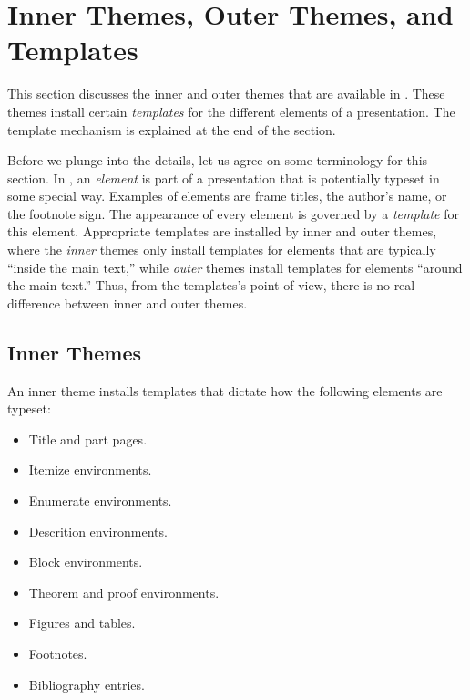 
%


\section{Inner Themes, Outer Themes, and Templates}

\label{section-elements}

This section discusses the inner and outer themes that are
available in \beamer. These themes install certain \emph{templates}
for the different elements of a presentation. The template mechanism is 
explained at the end of the section.

Before we plunge into the details, let us agree on some terminology
for this section. In \beamer, an \emph{element} is part of a
presentation that is potentially typeset in some special way. Examples
of elements are frame titles, the author's name, or the footnote
sign. The appearance of every element is governed by a \emph{template}
for this element. Appropriate templates are installed by inner and
outer themes, where the \emph{inner} themes only install templates for
elements that are typically ``inside the main text,'' while \emph{outer}
themes install templates for elements ``around the main text.'' Thus,
from the templates's point of view, there is no real difference
between inner and outer themes. 



\subsection{Inner Themes}

An inner theme installs templates that dictate how the following
elements are typeset:
\begin{itemize}
\item Title and part pages.
\item Itemize environments.
\item Enumerate environments.
\item Descrition environments.
\item Block environments.
\item Theorem and proof environments.
\item Figures and tables.
\item Footnotes.
\item Bibliography entries.
\end{itemize}


